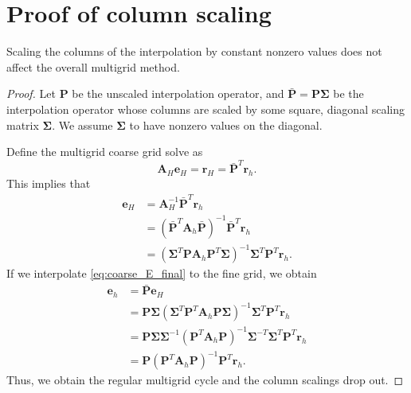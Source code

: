 \documentclass{article}
\newcommand{\mat}[1]{\bm{{#1}}}
\begin{document}
\section{Proof of column scaling}\label{sec:scaling_proof}
Scaling the columns of the interpolation by constant nonzero values does not affect the overall multigrid method.
\begin{proof}
  Let $\mat{P}$ be the unscaled interpolation operator, and $\mat{\bar{P}} = \mat{P} \mat{\Sigma}$ be the interpolation operator whose columns are scaled by some square, diagonal scaling matrix $\mat{\Sigma}$.  We assume $\mat{\Sigma}$ to have nonzero values on the diagonal.

  Define the multigrid coarse grid solve as
  \begin{equation}
    \mat{A}_H\mat{e}_H = \mat{r}_H = \mat{\bar{P}}^T\mat{r}_h.
  \end{equation}
  This implies that
  \begin{align}
    \mat{e}_H &= \mat{A}_H^{-1} \mat{\bar{P}}^T\mat{r}_h \\
              &= \left( \mat{\bar{P}}^T \mat{A}_h \mat{\bar{P}} \right)^{-1} \mat{\bar{P}}^T \mat{r}_h \\
              &= \left( \mat{\Sigma}^T \mat{P} \mat{A}_h \mat{P}^T \mat{\Sigma} \right)^{-1} \mat{\Sigma}^T \mat{P}^T \mat{r}_h. \label{eq:coarse_E_final}
  \end{align}
  If we interpolate \eqref{eq:coarse_E_final} to the fine grid, we obtain
  \begin{align}
    \mat{e}_h &= \mat{\bar{P}} \mat{e}_H \\
              &= \mat{P} \mat{\Sigma} \left( \mat{\Sigma}^T \mat{P}^T \mat{A}_h \mat{P} \mat{\Sigma} \right)^{-1} \mat{\Sigma}^T \mat{P}^T \mat{r}_h \\
              &= \mat{P} \mat{\Sigma} \mat{\Sigma}^{-1} \left( \mat{P}^T \mat{A}_h \mat{P} \right)^{-1} \mat{\Sigma}^{-T} \mat{\Sigma}^T \mat{P}^T \mat{r}_h \\
              &= \mat{P} \left( \mat{P}^T \mat{A}_h \mat{P} \right)^{-1}\mat{P}^T \mat{r}_h.
  \end{align}
  Thus, we obtain the regular multigrid cycle and the column scalings drop out.
\end{proof}

\nocite{*}


\end{document}
